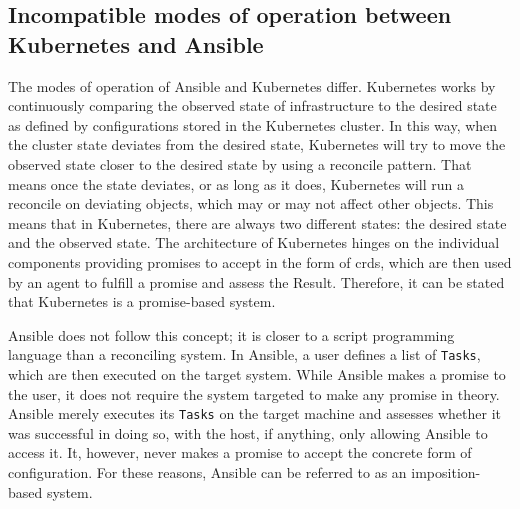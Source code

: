 \subsection{Incompatible modes of operation between Kubernetes and Ansible}
The modes of operation of Ansible and Kubernetes differ.
Kubernetes works by continuously comparing the observed state of infrastructure to the desired state as defined by configurations stored in the Kubernetes cluster.
In this way, when the cluster state deviates from the desired state, Kubernetes will try to move the observed state closer to the desired state by using a \gls{reconcile} pattern.
That means once the state deviates, or as long as it does, Kubernetes will run a reconcile on deviating objects, which may or may not affect other objects.
This means that in Kubernetes, there are always two different states: the desired state and the observed state.
The architecture of Kubernetes hinges on the individual components providing promises to accept in the form of \glspl{crd}, which are then used by an agent to fulfill a promise and assess the Result.
Therefore, it can be stated that Kubernetes is a promise-based system.
\parencite{poulton2025kubernetes, platformengineering-architects}

Ansible does not follow this concept; it is closer to a script programming language than a reconciling system.
In Ansible, a user defines a list of \texttt{Tasks}, which are then executed on the target system.
While Ansible makes a promise to the user, it does not require the system targeted to make any promise in theory.
Ansible merely executes its \texttt{Tasks} on the target machine and assesses whether it was successful in doing so, with the host, if anything, only allowing Ansible to access it.
It, however, never makes a promise to accept the concrete form of configuration.
For these reasons, Ansible can be referred to as an imposition-based system.
\parencite{ansibledocsindex, ansibleplaybooks, ansibleroles}
